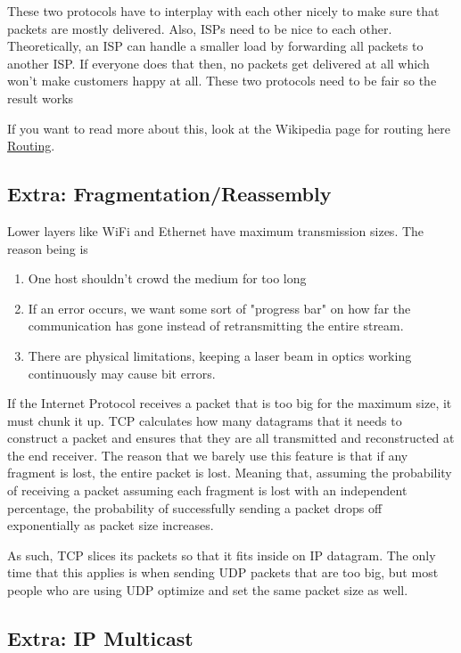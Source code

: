 These two protocols have to interplay with each other nicely to make sure that packets are mostly delivered.
Also, ISPs need to be nice to each other.
Theoretically, an ISP can handle a smaller load by forwarding all packets to another ISP.
If everyone does that then, no packets get delivered at all which won't make customers happy at all.
These two protocols need to be fair so the result works

If you want to read more about this, look at the Wikipedia page for routing here \href{https://en.wikipedia.org/wiki/Routing}{Routing}.

\subsection{Extra: Fragmentation/Reassembly}

Lower layers like WiFi and Ethernet have maximum transmission sizes.
The reason being is

\begin{enumerate}
  \item One host shouldn't crowd the medium for too long
  \item If an error occurs, we want some sort of "progress bar" on how far the communication has gone instead of retransmitting the entire stream.
  \item There are physical limitations, keeping a laser beam in optics working continuously may cause bit errors.
\end{enumerate}

If the Internet Protocol receives a packet that is too big for the maximum size, it must chunk it up.
TCP calculates how many datagrams that it needs to construct a packet and ensures that they are all transmitted and reconstructed at the end receiver.
The reason that we barely use this feature is that if any fragment is lost, the entire packet is lost.
Meaning that, assuming the probability of receiving a packet assuming each fragment is lost with an independent percentage, the probability of successfully sending a packet drops off exponentially as packet size increases.

As such, TCP slices its packets so that it fits inside on IP datagram.
The only time that this applies is when sending UDP packets that are too big, but most people who are using UDP optimize and set the same packet size as well.

\subsection{Extra: IP Multicast}

